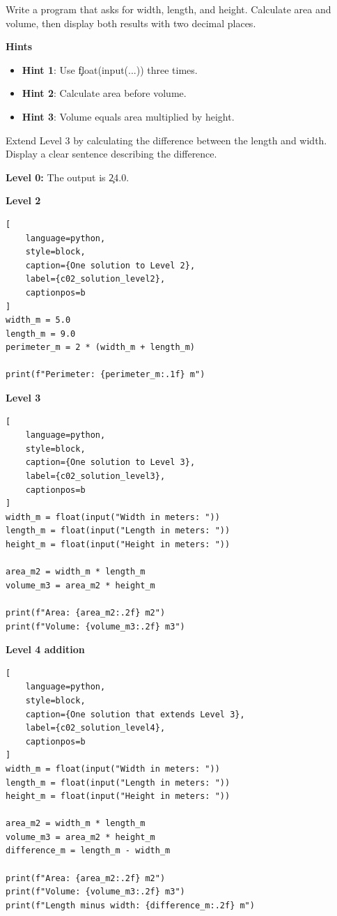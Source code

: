
Write a program that asks for width, length, and height. Calculate area and
volume, then display both results with two decimal places.

\textbf{Hints}
\begin{itemize}
    \item \textbf{Hint 1}: Use \c{float(input(...))} three times.
    \item \textbf{Hint 2}: Calculate area before volume.
    \item \textbf{Hint 3}: Volume equals area multiplied by height.
\end{itemize}


Extend Level 3 by calculating the difference between the length and width.
Display a clear sentence describing the difference.


\textbf{Level 0:} The output is \c{24.0}.

\textbf{Level 2}

\begin{lstlisting}[
    language=python,
    style=block,
    caption={One solution to Level 2},
    label={c02_solution_level2},
    captionpos=b
]
width_m = 5.0
length_m = 9.0
perimeter_m = 2 * (width_m + length_m)

print(f"Perimeter: {perimeter_m:.1f} m")
\end{lstlisting}

\textbf{Level 3}

\begin{lstlisting}[
    language=python,
    style=block,
    caption={One solution to Level 3},
    label={c02_solution_level3},
    captionpos=b
]
width_m = float(input("Width in meters: "))
length_m = float(input("Length in meters: "))
height_m = float(input("Height in meters: "))

area_m2 = width_m * length_m
volume_m3 = area_m2 * height_m

print(f"Area: {area_m2:.2f} m2")
print(f"Volume: {volume_m3:.2f} m3")
\end{lstlisting}

\textbf{Level 4 addition}

\begin{lstlisting}[
    language=python,
    style=block,
    caption={One solution that extends Level 3},
    label={c02_solution_level4},
    captionpos=b
]
width_m = float(input("Width in meters: "))
length_m = float(input("Length in meters: "))
height_m = float(input("Height in meters: "))

area_m2 = width_m * length_m
volume_m3 = area_m2 * height_m
difference_m = length_m - width_m

print(f"Area: {area_m2:.2f} m2")
print(f"Volume: {volume_m3:.2f} m3")
print(f"Length minus width: {difference_m:.2f} m")
\end{lstlisting}

